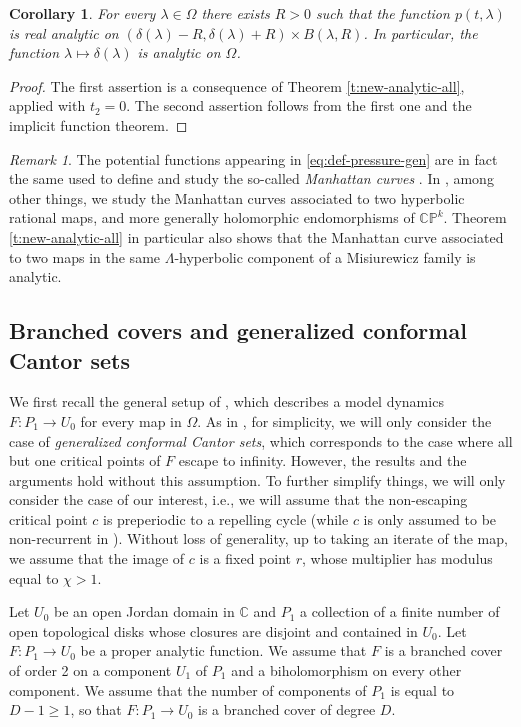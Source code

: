 \documentclass[11pt]{amsart}
\theoremstyle{plain}
\newtheorem{cor}[thm]{Corollary}
\theoremstyle{definition}
\theoremstyle{remark}
\newtheorem{rmk}[thm]{Remark}
\begin{document}
\begin{cor}\label{c:delta-ana}
For every $\lambda\in \Omega$ there exists $R>0$ such that the function $p(t, \lambda)$ is real analytic on 
$(\delta(\lambda)-R, \delta(\lambda)+R)
\times 
B(\lambda,R)$. In particular, the function $\lambda\mapsto \delta(\lambda)$ is analytic on $\Omega$.
\end{cor}

\begin{proof}
The first assertion is a consequence of Theorem \ref{t:new-analytic-all}, applied with $t_2=0$. The second assertion follows from the first one and the implicit function theorem.
\end{proof}

\begin{rmk}
The potential functions appearing in \eqref{eq:def-pressure-gen}
are in fact the same 
used to define and 
study the so-called {\it Manhattan curves}
\cite{Burger93,Sharp98}. 
In \cite{BH25}, among other things, we 
study the Manhattan curves associated to two hyperbolic rational maps, and more generally
holomorphic endomorphisms of $\mathbb C\mathbb P^k$. Theorem \ref{t:new-analytic-all} in particular also shows that the Manhattan curve associated to two maps in the same $\Lambda$-hyperbolic component 
 of a Misiurewicz family
is analytic.
\end{rmk}


\subsection{Branched covers and generalized conformal Cantor sets} \label{sec_3.1}
We first recall the general
setup of \cite{MakSmir03},
which describes a model dynamics $F \colon P_1 \to U_0$ for every map in $\Omega$.
As in \cite{MakSmir03}, for simplicity, we will only consider the case of \emph{generalized conformal Cantor sets},
which corresponds to the case where all but one critical points of $F$ escape to infinity. 
However, the results and the arguments 
hold without this assumption. 
To further simplify things, we will only consider the case of our interest, i.e., we will
assume 
that the non-escaping critical point $c$ is preperiodic to a repelling cycle (while $c$ is only assumed to be non-recurrent in \cite{MakSmir03}).
Without loss of generality, up to taking an iterate of the map, we assume that the image of $c$ is a fixed point $r$,
whose multiplier has modulus equal to $\chi>1$.

\medskip

Let $U_0$ be an open Jordan domain in $\mathbb C$ 
and $P_1$ a collection of a finite number of open topological disks whose closures are disjoint and contained in $U_0$. Let $F \colon P_1 \to U_0$ be a proper analytic function.
We assume that $F$ is a branched cover of order 2 on a component $U_1$ of $P_1$ and a biholomorphism on every other component. We assume that the number of components of $P_1$ is equal to $D-1\geq 1$, so that $F\colon P_1\to U_0$ is a branched cover of degree $D$.
\end{document}
